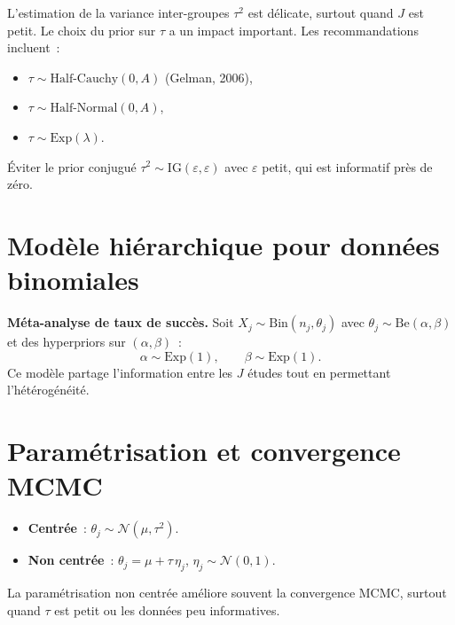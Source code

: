 \begin{attention}[title=\textbf{Difficult\'e de l'estimation de $\tau$}]
L'estimation de la variance inter-groupes $\tau^2$ est d\'elicate,
surtout quand $J$ est petit. Le choix du prior sur $\tau$ a un impact
important. Les recommandations incluent~:
\begin{itemize}
  \item $\tau \sim \text{Half-Cauchy}(0, A)$ (Gelman, 2006),
  \item $\tau \sim \text{Half-Normal}(0, A)$,
  \item $\tau \sim \text{Exp}(\lambda)$.
\end{itemize}
\'Eviter le prior conjugu\'e $\tau^2 \sim \text{IG}(\varepsilon, \varepsilon)$
avec $\varepsilon$ petit, qui est informatif pr\`es de z\'ero.
\end{attention}

\section{Mod\`ele hi\'erarchique pour donn\'ees binomiales}

\begin{exemple}
\textbf{M\'eta-analyse de taux de succ\`es.}
Soit $X_j \sim \text{Bin}(n_j, \theta_j)$ avec
$\theta_j \sim \text{Be}(\alpha, \beta)$ et des hyperpriors sur
$(\alpha, \beta)$~:
\[
  \alpha \sim \text{Exp}(1), \qquad \beta \sim \text{Exp}(1).
\]
Ce mod\`ele partage l'information entre les $J$ \'etudes tout en
permettant l'h\'et\'erog\'en\'eit\'e.
\end{exemple}

\section{Param\'etrisation et convergence MCMC}

\begin{definition}
\begin{itemize}
  \item \textbf{Centr\'ee}~: $\theta_j \sim \mathcal{N}(\mu, \tau^2)$.
  \item \textbf{Non centr\'ee}~: $\theta_j = \mu + \tau\,\eta_j$,
        $\eta_j \sim \mathcal{N}(0, 1)$.
\end{itemize}
La param\'etrisation non centr\'ee am\'eliore souvent la convergence
MCMC, surtout quand $\tau$ est petit ou les donn\'ees peu informatives.
\end{definition}


